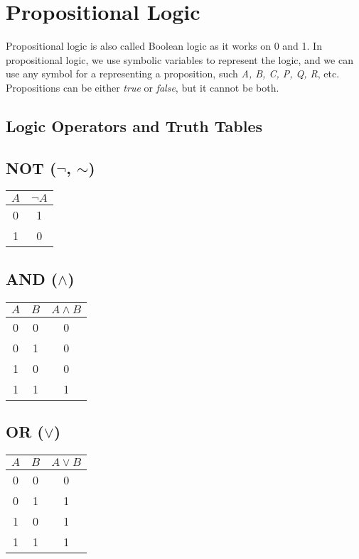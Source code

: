 \section{Propositional Logic}
Propositional logic is also called Boolean logic as it works on 0 and 1. In propositional logic, we use symbolic variables to represent the logic, and we can use any symbol for a representing a proposition, such \textit{A, B, C, P, Q, R}, etc. Propositions can be either \textit{true} or \textit{false}, but it cannot be both.

\subsection{Logic Operators and Truth Tables}
\smallskip
\begin{multicols}{2}

\subsection*{NOT ($\neg$, $\sim$)}

\begin{tabular}{cc}
\toprule
$A$ & $\neg A$ \\
\midrule
0 & 1 \\
1 & 0 \\
\bottomrule
\end{tabular}

\vspace{1em}

\subsection*{AND ($\land$)}

\begin{tabular}{ccc}
\toprule
$A$ & $B$ & $A \land B$ \\
\midrule
0 & 0 & 0 \\
0 & 1 & 0 \\
1 & 0 & 0 \\
1 & 1 & 1 \\
\bottomrule
\end{tabular}

\vspace{1em}

\subsection*{OR ($\lor$)}

\begin{tabular}{ccc}
\toprule
$A$ & $B$ & $A \lor B$ \\
\midrule
0 & 0 & 0 \\
0 & 1 & 1 \\
1 & 0 & 1 \\
1 & 1 & 1 \\
\bottomrule
\end{tabular}


\end{multicols}
